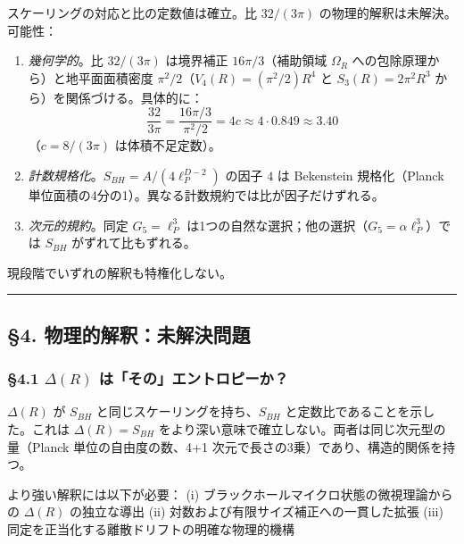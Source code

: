 \documentclass[a4paper,11pt]{ltjsarticle}
\theoremstyle{definition}
\begin{document}
スケーリングの対応と比の定数値は確立。比 \(32/(3\pi)\)
の物理的解釈は未解決。可能性：

\begin{enumerate}
\def\labelenumi{\arabic{enumi}.}
\item
  \emph{幾何学的}。比 \(32/(3\pi)\) は境界補正 \(16\pi/3\)（補助領域
  \(\Omega_R\) への包除原理から）と地平面面積密度
  \(\pi^2/2\)（\(V_4(R) = (\pi^2/2) R^4\) と \(S_3(R) = 2\pi^2 R^3\)
  から）を関係づける。具体的に：
  \[\frac{32}{3\pi} = \frac{16\pi/3}{\pi^2/2} = 4c \approx 4 \cdot 0.849 \approx 3.40\]
  （\(c = 8/(3\pi)\) は体積不足定数）。
\item
  \emph{計数規格化}。\(S_{BH} = A/(4 \ell_P^{D-2})\) の因子 \(4\) は
  Bekenstein 規格化（Planck
  単位面積の4分の1）。異なる計数規約では比が因子だけずれる。
\item
  \emph{次元的規約}。同定 \(G_5 = \ell_P^3\)
  は1つの自然な選択；他の選択（\(G_5 = \alpha \ell_P^3\)）では
  \(S_{BH}\) がずれて比もずれる。
\end{enumerate}

現段階でいずれの解釈も特権化しない。

\begin{center}\rule{0.5\linewidth}{0.5pt}\end{center}

\subsection{§4.
物理的解釈：未解決問題}\label{ux7269ux7406ux7684ux89e3ux91c8ux672aux89e3ux6c7aux554fux984c}

\subsubsection{\texorpdfstring{§4.1 \(\Delta(R)\)
は「その」エントロピーか？}{§4.1 \textbackslash Delta(R) は「その」エントロピーか？}}\label{deltar-ux306fux305dux306eux30a8ux30f3ux30c8ux30edux30d4ux30fcux304b}

\(\Delta(R)\) が \(S_{BH}\) と同じスケーリングを持ち、\(S_{BH}\)
と定数比であることを示した。これは \(\Delta(R) = S_{BH}\)
をより深い意味で確立しない。両者は同じ次元型の量（Planck
単位の自由度の数、4+1 次元で長さの3乗）であり、構造的関係を持つ。

より強い解釈には以下が必要： (i)
ブラックホールマイクロ状態の微視理論からの \(\Delta(R)\) の独立な導出
(ii) 対数および有限サイズ補正への一貫した拡張 (iii)
同定を正当化する離散ドリフトの明確な物理的機構
\end{document}
